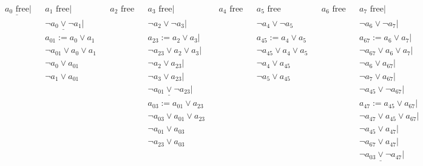 \documentclass{article}
\begin{document}
\begin{align*}
  && \underline{a_0 \text{ free}}|
  && a_1 \text{ free}|
  && a_2 \text{ free}
  && a_3 \text{ free}|
  && a_4 \text{ free}
  && a_5 \text{ free}
  && a_6 \text{ free}
  && a_7 \text{ free}| \\
  && && \underline{\lnot a_0 \lor \lnot a_1}|
  && && \lnot a_2 \lor \lnot a_3|
  && && \lnot a_4 \lor \lnot a_5
  && && \lnot a_6 \lor \lnot a_7| \\
  && && a_{01} := a_0 \lor a_1
  && && a_{23} := a_2 \lor a_3|
  && && a_{45} := a_4 \lor a_5
  && && a_{67} := a_6 \lor a_7| \\
  && && \lnot a_{01} \lor a_0 \lor a_1
  && && \lnot a_{23} \lor a_2 \lor a_3|
  && && \lnot a_{45} \lor a_4 \lor a_5
  && && \lnot a_{67} \lor a_6 \lor a_7| \\
  && && \lnot a_0 \lor a_{01}
  && && \lnot a_2 \lor a_{23}|
  && && \lnot a_4 \lor a_{45}
  && && \lnot a_6 \lor a_{67}| \\
  && && \lnot a_1 \lor a_{01}
  && && \lnot a_3 \lor a_{23}|
  && && \lnot a_5 \lor a_{45}
  && && \lnot a_7 \lor a_{67}| \\
  && && && && \underline{\lnot a_{01} \lor \lnot  a_{23}}|
  && && && && \lnot a_{45} \lor \lnot  a_{67}| \\
  && && && && a_{03} := a_{01} \lor a_{23}
  && && && && a_{47} := a_{45} \lor a_{67}| \\
  && && && && \lnot a_{03} \lor a_{01} \lor a_{23}
  && && && && \lnot a_{47} \lor a_{45} \lor a_{67}| \\
  && && && && \lnot a_{01} \lor a_{03}
  && && && && \lnot a_{45} \lor a_{47}| \\
  && && && && \lnot a_{23} \lor a_{03}
  && && && && \lnot a_{67} \lor a_{47}| \\
  && && && && && && && && \underline{\lnot a_{03} \lor \lnot a_{47}}|
\end{align*}
\end{document}
